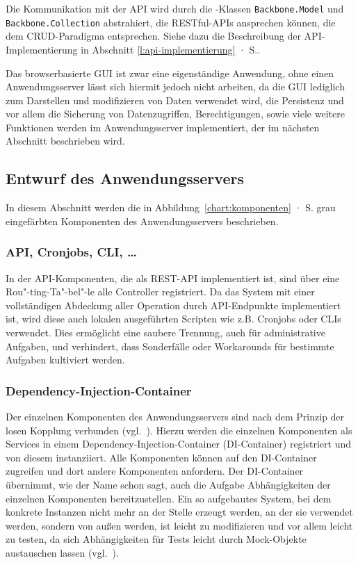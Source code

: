 Die Kommunikation mit der API wird durch die -Klassen \texttt{Backbone.Model} und \texttt{Backbone.Collection} abstrahiert, die RESTful-APIs ansprechen können, die dem CRUD-Paradigma entsprechen. Siehe dazu die Beschreibung der API-Implementierung in Abschnitt \ref{l:api-implementierung} · S.\pageref{l:api-implementierung}.

\secbar

Das browserbasierte GUI ist zwar eine eigenständige Anwendung, ohne einen Anwendungsserver lässt sich hiermit jedoch nicht arbeiten, da die GUI lediglich zum Darstellen und modifizieren von Daten verwendet wird, die Persistenz und vor allem die Sicherung von Datenzugriffen, Berechtigungen, sowie viele weitere Funktionen werden im Anwendungsserver implementiert, der im nächsten Abschnitt beschrieben wird.

\pagebreak

\subsection{Entwurf des Anwendungsservers}\label{l:entwurf-server}

In diesem Abschnitt werden die in Abbildung~\ref{chart:komponenten} · S.\pageref{chart:komponenten} grau eingefärbten Komponenten des Anwendungsservers beschrieben.

\subsubsection{API, Cronjobs, CLI, …}

In der API-Komponenten, die als REST-API implementiert ist, sind über eine Rou"-ting-Ta"-bel"-le alle Controller registriert. Da das System mit einer vollständigen Abdeckung aller Operation durch API-Endpunkte implementiert ist, wird diese auch lokalen ausgeführten Scripten wie z.B. Cronjobs oder CLIs verwendet. Dies ermöglicht eine saubere Trennung, auch für administrative Aufgaben, und verhindert, dass Sonderfälle oder Workarounds für bestimmte Aufgaben kultiviert werden.

\subsubsection{Dependency-Injection-Container}

Der einzelnen Komponenten des Anwendungsservers sind nach dem Prinzip der losen Kopplung verbunden (vgl.~\cite[S.62]{hn-web20}). Hierzu werden die einzelnen Komponenten als Services in einem Dependency-Injection-Container (DI-Container) registriert und von diesem instanziiert. Alle Komponenten können auf den DI-Container zugreifen und dort andere Komponenten anfordern. Der DI-Container übernimmt, wie der Name schon sagt, auch die Aufgabe Abhängigkeiten der einzelnen Komponenten bereitzustellen. Ein so aufgebautes System, bei dem konkrete Instanzen nicht mehr an der Stelle erzeugt werden, an der sie verwendet werden, sondern von außen  werden, ist leicht zu modifizieren und vor allem leicht zu testen, da sich Abhängigkeiten für Tests leicht durch Mock-Objekte austauschen lassen (vgl.~\cite[Kap.2]{freeman2009growing}).


